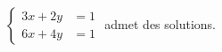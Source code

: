 $\begin{cases}3x+2y &= 1 \\ 6x+4y &= 1\end{cases}$ admet des solutions.

\begin{reponses}
\end{reponses}

